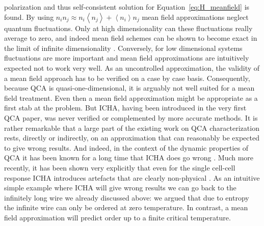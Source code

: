 polarization and thus self-consistent solution for
Equation~\eqref{eq:H_meanfield} is found. By using $n_i n_j \approx n_i \left<
n_j \right> + \left< n_i \right> n_j$ mean field approximations neglect quantum
fluctuations. Only at high dimensionality can these fluctuations really average
to zero, and indeed mean field schemes can be shown to become exact in the limit
of infinite dimensionality \cite{Fehske}. Conversely, for low dimensional
systems fluctuations are more important and mean field approximations are
intuitively expected not to work very well. As an uncontrolled approximation, the
validity of a mean field approach has to be verified on a case by case basis.
Consequently, because QCA is quasi-one-dimensional, it is arguably not
well suited for a mean field treatment. Even then a mean field approximation
might be appropriate as a first stab at the problem. But ICHA, having been introduced
in the very first QCA paper, was never verified or complemented by more accurate
methods. It is rather remarkable that a large part of the existing work on QCA
characterization rests, directly or indirectly, on an approximation that can
reasonably be expected to give wrong results. And indeed, in the context of the
dynamic properties of QCA it has been known for a long time that ICHA does go
wrong \cite{toth2001role}. Much more recently, it has been shown very explicitly
that even for the single cell-cell response ICHA introduces artefacts that are
clearly non-physical \cite{taucer2012consequences}. As an intuitive simple
example where ICHA will give wrong results we can go back to the infinitely long
wire we already discussed above: we argued that due to entropy the infinite wire
can only be ordered at zero temperature. In contrast, a mean field approximation
will predict order up to a finite critical temperature. 

